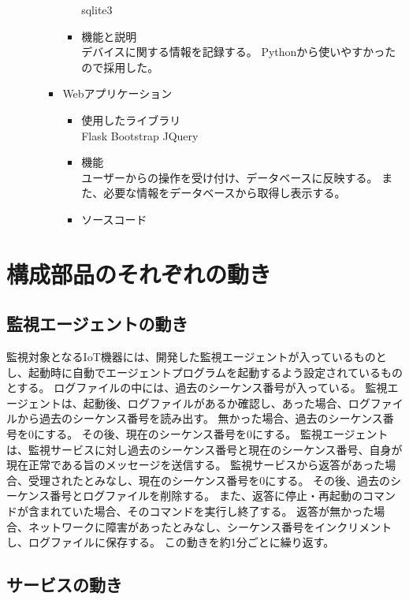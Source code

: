 \begin{itemize}
\begin{itemize}
\begin{itemize}
\begin{itemize}
								sqlite3
							\item 機能と説明\\
								デバイスに関する情報を記録する。
								Pythonから使いやすかったので採用した。
						\end{itemize}
					\item Webアプリケーション
						\begin{itemize}
							\item 使用したライブラリ\\
								Flask Bootstrap JQuery
							\item 機能\\
								ユーザーからの操作を受け付け、データベースに反映する。
								また、必要な情報をデータベースから取得し表示する。
							\item ソースコード\\
						\end{itemize}
				\end{itemize}
		\end{itemize}
\end{itemize}
\section{構成部品のそれぞれの動き}

\subsection{監視エージェントの動き}
監視対象となるIoT機器には、開発した監視エージェントが入っているものとし、起動時に自動でエージェントプログラムを起動するよう設定されているものとする。
ログファイルの中には、過去のシーケンス番号が入っている。
監視エージェントは、起動後、ログファイルがあるか確認し、あった場合、ログファイルから過去のシーケンス番号を読み出す。
無かった場合、過去のシーケンス番号を0にする。
その後、現在のシーケンス番号を0にする。
監視エージェントは、監視サービスに対し過去のシーケンス番号と現在のシーケンス番号、自身が現在正常である旨のメッセージを送信する。
監視サービスから返答があった場合、受理されたとみなし、現在のシーケンス番号を0にする。
その後、過去のシーケンス番号とログファイルを削除する。
また、返答に停止・再起動のコマンドが含まれていた場合、そのコマンドを実行し終了する。
返答が無かった場合、ネットワークに障害があったとみなし、シーケンス番号をインクリメントし、ログファイルに保存する。
この動きを約1分ごとに繰り返す。

\subsection{サービスの動き}
